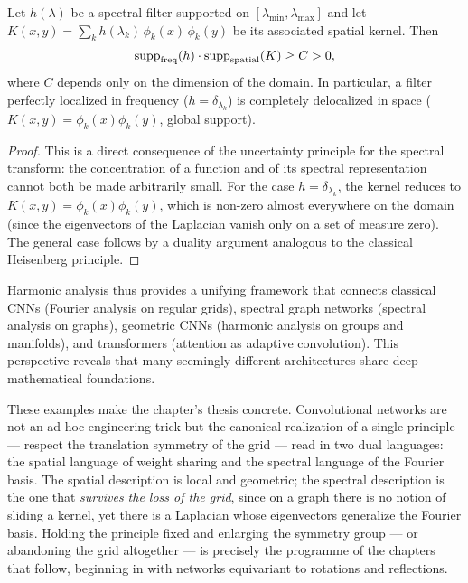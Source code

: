 \begin{proposition}
\label{prop:grids:loc-global}
Let $h(\lambda)$ be a spectral filter supported on
$[\lambda_{\min}, \lambda_{\max}]$ and let
$K(x,y) = \sum_k h(\lambda_k)\, \phi_k(x)\,\phi_k(y)$ be its associated spatial
kernel. Then
\[
  \operatorname{supp}_{\mathrm{freq}}(h) \cdot \operatorname{supp}_{\mathrm{spatial}}(K) \geq C > 0,
\]
where $C$ depends only on the dimension of the domain. In particular, a filter
perfectly localized in frequency ($h = \delta_{\lambda_k}$) is completely
delocalized in space ($K(x,y) = \phi_k(x)\phi_k(y)$, global support).
\end{proposition}

\begin{proof}
This is a direct consequence of the uncertainty principle for the spectral
transform: the concentration of a function and of its spectral representation
cannot both be made arbitrarily small. For the case $h = \delta_{\lambda_k}$,
the kernel reduces to $K(x,y) = \phi_k(x)\phi_k(y)$, which is non-zero almost
everywhere on the domain (since the eigenvectors of the Laplacian vanish only on
a set of measure zero). The general case follows by a duality argument analogous
to the classical Heisenberg principle.
\end{proof}

Harmonic analysis thus provides a unifying framework that connects classical
CNNs (Fourier analysis on regular grids), spectral graph networks (spectral
analysis on graphs), geometric CNNs (harmonic analysis on groups and manifolds),
and transformers (attention as adaptive convolution). This perspective reveals
that many seemingly different architectures share deep mathematical foundations.

These examples make the chapter's thesis concrete. Convolutional networks are
not an ad hoc engineering trick but the canonical realization of a single
principle --- respect the translation symmetry of the grid --- read in two dual
languages: the spatial language of weight sharing and the spectral language of
the Fourier basis. The spatial description is local and geometric; the spectral
description is the one that \emph{survives the loss of the grid}, since on a
graph there is no notion of sliding a kernel, yet there is a Laplacian whose
eigenvectors generalize the Fourier basis. Holding the principle fixed and
enlarging the symmetry group --- or abandoning the grid altogether --- is
precisely the programme of the chapters that follow, beginning in
 with networks equivariant to rotations and reflections.
